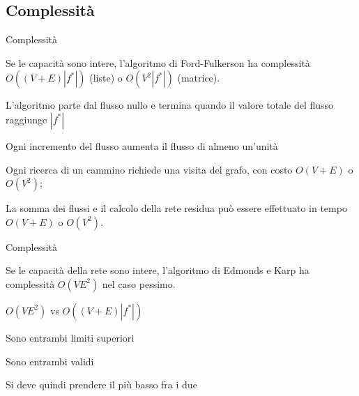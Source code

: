 \subsection{Complessità}


\begin{frame}{Complessità}

\vspace{-3pt}
\begin{myboxtitle}
Se le capacità sono intere, l'algoritmo di Ford-Fulkerson
ha complessità \alert{$O((V+E)|f^*|)$} (liste) o \alert{$O(V^2|f^*|)$} (matrice).
\end{myboxtitle}

\BIL
\item L'algoritmo parte dal flusso nullo e termina quando il valore totale
del flusso raggiunge $|f^*|$
\item Ogni incremento del flusso aumenta il flusso di almeno un'unità
\item Ogni ricerca di un cammino richiede una visita del grafo, con
costo $O(V+E)$ o $O(V^2)$; 
\item La somma dei flussi e il calcolo della rete residua può essere 
effettuato in tempo $O(V+E)$ o $O(V^2)$.
\EIL

\end{frame}

\begin{frame}{Complessità}

\vspace{-3pt}
\begin{myboxtitle}
Se le capacità della rete sono intere, l'algoritmo di Edmonds e Karp
ha complessità \alert{$O(VE^2)$} nel caso pessimo.
\end{myboxtitle}


\BIL
\item $O(VE^2)$ vs $O((V+E)|f^*|)$
\item Sono entrambi limiti superiori
\item Sono entrambi validi
\item Si deve quindi prendere il più basso fra i due
\EIL

\end{frame}

